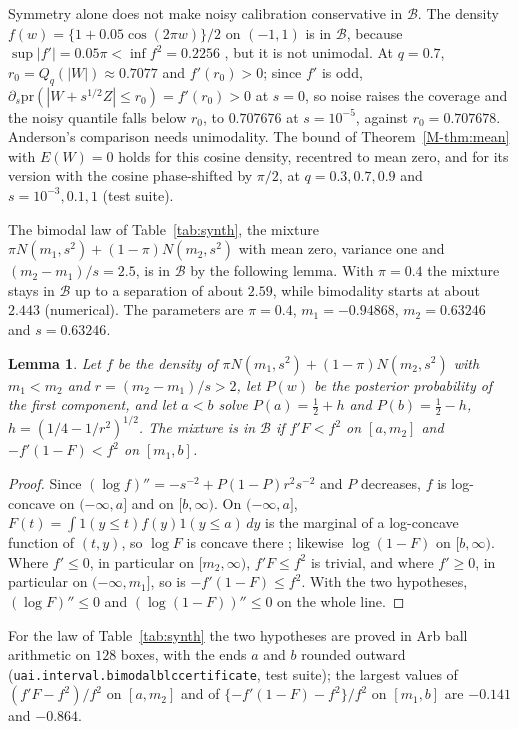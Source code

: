 \documentclass[11pt]{article}
\renewcommand{\_}{\usc\allowbreak}
\newtheorem{lemma}{Lemma}
\newcommand{\pr}{\mathrm{pr}}
\begin{document}
Symmetry alone does not make noisy calibration conservative in $\mathcal B$. The density $f(w) = \{1 + 0.05\cos(2\pi w)\}/2$ on $(-1, 1)$ is in $\mathcal B$, because $\sup|f'| = 0.05\pi < \inf f^2 = 0.2256$ \citep[][Theorem~1]{dumbgen2017}, but it is not unimodal. At $q = 0.7$, $r_0 = Q_q(|W|) \approx 0.7077$ and $f'(r_0) > 0$; since $f'$ is odd, $\partial_s \pr(|W + s^{1/2}Z| \le r_0) = f'(r_0) > 0$ at $s = 0$, so noise raises the coverage and the noisy quantile falls below $r_0$, to $0.707676$ at $s = 10^{-5}$, against $r_0 = 0.707678$. Anderson's comparison needs unimodality. The bound of Theorem~\ref{M-thm:mean} with $E(W) = 0$ holds for this cosine density, recentred to mean zero, and for its version with the cosine phase-shifted by $\pi/2$, at $q = 0.3, 0.7, 0.9$ and $s = 10^{-3}, 0.1, 1$ (test suite).

The bimodal law of Table~\ref{tab:synth}, the mixture $\pi N(m_1, s^2) + (1-\pi)N(m_2, s^2)$ with mean zero, variance one and $(m_2 - m_1)/s = 2.5$, is in $\mathcal B$ by the following lemma. With $\pi = 0.4$ the mixture stays in $\mathcal B$ up to a separation of about $2.59$, while bimodality starts at about $2.443$ (numerical). The parameters are $\pi = 0.4$, $m_1 = -0.94868$, $m_2 = 0.63246$ and $s = 0.63246$.

\begin{lemma}\label{lem:bimodal}
Let $f$ be the density of $\pi N(m_1, s^2) + (1-\pi)N(m_2, s^2)$ with $m_1 < m_2$ and $r = (m_2 - m_1)/s > 2$, let $P(w)$ be the posterior probability of the first component, and let $a < b$ solve $P(a) = \tfrac12 + h$ and $P(b) = \tfrac12 - h$, $h = (1/4 - 1/r^2)^{1/2}$. The mixture is in $\mathcal B$ if $f'F < f^2$ on $[a, m_2]$ and $-f'(1-F) < f^2$ on $[m_1, b]$.
\end{lemma}

\begin{proof}
Since $(\log f)'' = -s^{-2} + P(1-P)r^2s^{-2}$ and $P$ decreases, $f$ is log-concave on $(-\infty, a]$ and on $[b, \infty)$. On $(-\infty, a]$, $F(t) = \int 1(y \le t)f(y)1(y \le a)\,dy$ is the marginal of a log-concave function of $(t, y)$, so $\log F$ is concave there \citep{prekopa1973}; likewise $\log(1-F)$ on $[b, \infty)$. Where $f' \le 0$, in particular on $[m_2, \infty)$, $f'F \le f^2$ is trivial, and where $f' \ge 0$, in particular on $(-\infty, m_1]$, so is $-f'(1-F) \le f^2$. With the two hypotheses, $(\log F)'' \le 0$ and $(\log(1-F))'' \le 0$ on the whole line.
\end{proof}

For the law of Table~\ref{tab:synth} the two hypotheses are proved in Arb ball arithmetic on $128$ boxes, with the ends $a$ and $b$ rounded outward (\texttt{uai.interval.bimodal\_blc\_certificate}, test suite); the largest values of $(f'F - f^2)/f^2$ on $[a, m_2]$ and of $\{-f'(1-F) - f^2\}/f^2$ on $[m_1, b]$ are $-0.141$ and $-0.864$.
\end{document}
